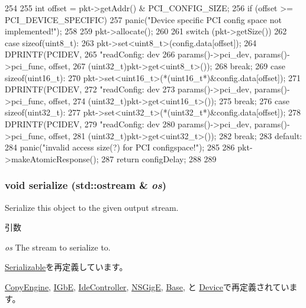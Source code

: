 \begin{DoxyCode}
254 {
255     int offset = pkt->getAddr() & PCI_CONFIG_SIZE;
256     if (offset >= PCI_DEVICE_SPECIFIC)
257         panic("Device specific PCI config space not implemented!\n");
258 
259     pkt->allocate();
260 
261     switch (pkt->getSize()) {
262       case sizeof(uint8_t):
263         pkt->set<uint8_t>(config.data[offset]);
264         DPRINTF(PCIDEV,
265             "readConfig:  dev %
266             params()->pci_dev, params()->pci_func, offset,
267             (uint32_t)pkt->get<uint8_t>());
268         break;
269       case sizeof(uint16_t):
270         pkt->set<uint16_t>(*(uint16_t*)&config.data[offset]);
271         DPRINTF(PCIDEV,
272             "readConfig:  dev %
273             params()->pci_dev, params()->pci_func, offset,
274             (uint32_t)pkt->get<uint16_t>());
275         break;
276       case sizeof(uint32_t):
277         pkt->set<uint32_t>(*(uint32_t*)&config.data[offset]);
278         DPRINTF(PCIDEV,
279             "readConfig:  dev %
280             params()->pci_dev, params()->pci_func, offset,
281             (uint32_t)pkt->get<uint32_t>());
282         break;
283       default:
284         panic("invalid access size(?) for PCI configspace!\n");
285     }
286     pkt->makeAtomicResponse();
287     return configDelay;
288 
289 }
\end{DoxyCode}
\hypertarget{classPciDevice_a53e036786d17361be4c7320d39c99b84}{
\subsubsection[{serialize}]{\setlength{\rightskip}{0pt plus 5cm}void serialize (std::ostream \& {\em os})}}
\label{classPciDevice_a53e036786d17361be4c7320d39c99b84}
Serialize this object to the given output stream. 
\begin{DoxyParams}{引数}
\item[{\em os}]The stream to serialize to. \end{DoxyParams}


\hyperlink{classSerializable_ad6272f80ae37e8331e3969b3f072a801}{Serializable}を再定義しています。

\hyperlink{classCopyEngine_a53e036786d17361be4c7320d39c99b84}{CopyEngine}, \hyperlink{classIGbE_a53e036786d17361be4c7320d39c99b84}{IGbE}, \hyperlink{classIdeController_a53e036786d17361be4c7320d39c99b84}{IdeController}, \hyperlink{classNSGigE_ad6272f80ae37e8331e3969b3f072a801}{NSGigE}, \hyperlink{classSinic_1_1Base_a53e036786d17361be4c7320d39c99b84}{Base}, と \hyperlink{classSinic_1_1Device_a53e036786d17361be4c7320d39c99b84}{Device}で再定義されています。


